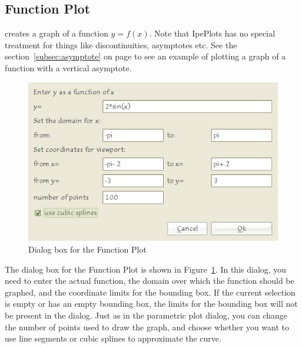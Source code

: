 \documentclass{article}
\begin{document}
\subsection{Function Plot}
creates a graph of a function $y = f(x)$. Note that IpePlots has no special
treatment for things like discontinuities, asymptotes etc. See the
section~\ref{subsec:asymptote} on page \pageref{subsec:asymptote} to see an
example of plotting a graph of a function with a vertical asymptote.

\begin{figure}[h]
   \begin{center}
      \includegraphics[scale=3]{function_dialog.png}
   \end{center}
   \caption{Dialog box for the Function Plot}
   \label{fig:function_dialog}
\end{figure}

The dialog box for the Function Plot is shown in
Figure~\ref{fig:function_dialog}.  In this dialog, you need to enter the actual
function, the domain over which the function should be graphed, and the
coordinate limits for the bounding box. If the current selection is empty or
has an empty bounding box, the limits for the bounding box will not be present
in the dialog.  Just as in the parametric plot dialog, you can change the
number of points used to draw the graph, and choose whether you want to use
line segments or cubic splines to approximate the curve. 
\end{document}
